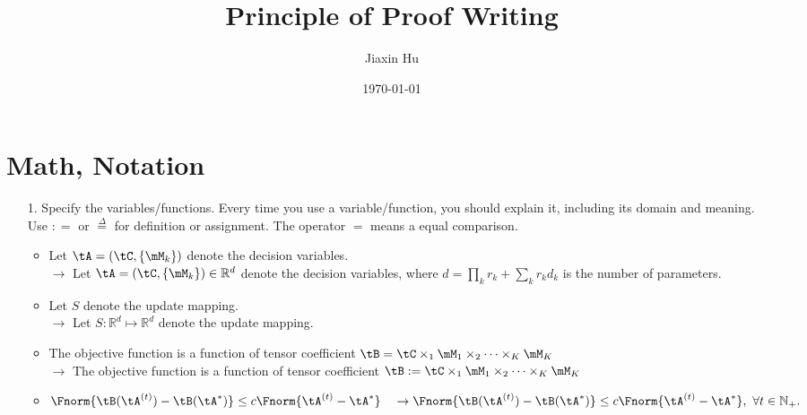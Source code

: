 \documentclass[11pt]{article}
\title{
\centering 
Principle of Proof Writing}
\date{\today}
\author{%
Jiaxin Hu
}
\theoremstyle{plain}
\theoremstyle{definition}
\begin{document}
\maketitle


\section{Math, Notation}
\begin{enumerate}
    \item[1.] Specify the variables/functions. Every time you use a variable/function, you should explain it, including its domain and meaning. Use $: =$ or $\overset{\Delta}{=} $ for definition or assignment. The operator $=$ means a equal comparison.
    \begin{itemize}
        \item Let $\tA=(\tC, \{\mM_k\})$ denote the decision variables.  \\$ \rightarrow$ Let $\tA=(\tC, \{\mM_k\}) \in \mathbb{R}^d$ denote the decision variables, where $d = \prod_k r_k + \sum_k r_k d_k$ is the number of parameters.
        \item Let $S$ denote the update mapping.\\
        $\rightarrow$ Let $S : \mathbb{R}^d \mapsto  \mathbb{R}^d$ denote the update mapping.
        \item The objective function is a function of tensor coefficient $\tB = \tC\times_1\mM_1\times_2\cdots \times_K\mM_K$ \\
        $\rightarrow$ The objective function is a function of tensor coefficient $\tB := \tC\times_1\mM_1\times_2\cdots \times_K\mM_K$
        \item $\Fnorm{\tB(\tA^{(t)}) - \tB(\tA^{*})} \leq c \Fnorm{\tA^{(t)} - \tA^*}  \quad \rightarrow \Fnorm{\tB(\tA^{(t)}) - \tB(\tA^{*})} \leq c \Fnorm{\tA^{(t)} - \tA^*},\ \forall t \in \mathbb{N}_{+}. $
    \end{itemize}
    

\end{enumerate}
\end{document}
